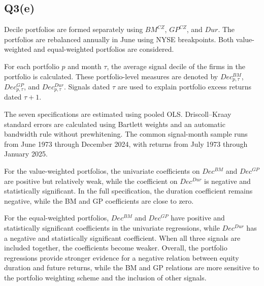 \documentclass{article}
\begin{document}
\subsection{Q3(e)}

Decile portfolios are formed separately using \(BM^{CZ}\), \(GP^{CZ}\), and \(Dur\). The portfolios are rebalanced annually in June using NYSE breakpoints. Both value-weighted and equal-weighted portfolios are considered.

For each portfolio \(p\) and month \(\tau\), the average signal decile of the firms in the portfolio is calculated. These portfolio-level measures are denoted by \(Dec^{BM}_{p,\tau}\), \(Dec^{GP}_{p,\tau}\), and \(Dec^{Dur}_{p,\tau}\). Signals dated \(\tau\) are used to explain portfolio excess returns dated \(\tau+1\).

The seven specifications are estimated using pooled OLS. Driscoll--Kraay standard errors are calculated using Bartlett weights and an automatic bandwidth rule without prewhitening. The common signal-month sample runs from June 1973 through December 2024, with returns from July 1973 through January 2025.



For the value-weighted portfolios, the univariate coefficients on \(Dec^{BM}\) and \(Dec^{GP}\) are positive but relatively weak, while the coefficient on \(Dec^{Dur}\) is negative and statistically significant. In the full specification, the duration coefficient remains negative, while the BM and GP coefficients are close to zero.

For the equal-weighted portfolios, \(Dec^{BM}\) and \(Dec^{GP}\) have positive and statistically significant coefficients in the univariate regressions, while \(Dec^{Dur}\) has a negative and statistically significant coefficient. When all three signals are included together, the coefficients become weaker. Overall, the portfolio regressions provide stronger evidence for a negative relation between equity duration and future returns, while the BM and GP relations are more sensitive to the portfolio weighting scheme and the inclusion of other signals.

\newpage


\end{document}
